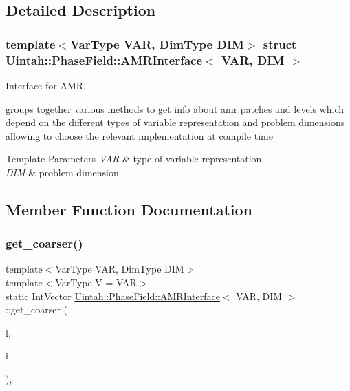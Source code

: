 \subsection{Detailed Description}
\subsubsection*{template$<$Var\+Type V\+AR, Dim\+Type D\+IM$>$\newline
struct Uintah\+::\+Phase\+Field\+::\+A\+M\+R\+Interface$<$ V\+A\+R, D\+I\+M $>$}

Interface for A\+MR. 

groups together various methods to get info about amr patches and levels which depend on the different types of variable representation and problem dimensions allowing to choose the relevant implementation at compile time


\begin{DoxyTemplParams}{Template Parameters}
{\em V\+AR} & type of variable representation \\
\hline
{\em D\+IM} & problem dimension \\
\hline
\end{DoxyTemplParams}


\subsection{Member Function Documentation}
\mbox{\label{structUintah_1_1PhaseField_1_1AMRInterface_a567b8c307a636ab6addd2fa4272581a4}} 
\subsubsection{\texorpdfstring{get\+\_\+coarser()}{get\_coarser()}}
{\footnotesize\ttfamily template$<$Var\+Type V\+AR, Dim\+Type D\+IM$>$ \\
template$<$Var\+Type V = V\+AR$>$ \\
static Int\+Vector \hyperlink{structUintah_1_1PhaseField_1_1AMRInterface}{Uintah\+::\+Phase\+Field\+::\+A\+M\+R\+Interface}$<$ V\+AR, D\+IM $>$\+::get\+\_\+coarser (\begin{DoxyParamCaption}\item[{const Level $\ast$}]{l,  }\item[{const Int\+Vector \&}]{i }\end{DoxyParamCaption})\hspace{0.3cm}{\ttfamily [inline]}, {\ttfamily [static]}}

